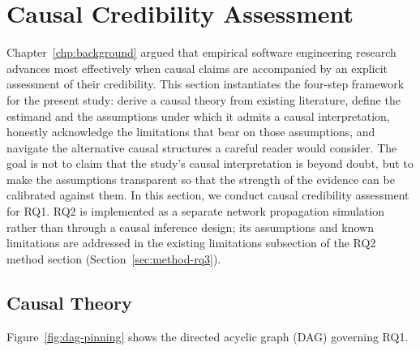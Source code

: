 \section{Causal Credibility Assessment}
\label{sec:pinning-credibility}

Chapter~\ref{chp:background} argued that empirical software engineering research advances most effectively when causal claims are accompanied by an explicit assessment of their credibility.
This section instantiates the four-step framework for the present study: derive a causal theory from existing literature, define the estimand and the assumptions under which it admits a causal interpretation, honestly acknowledge the limitations that bear on those assumptions, and navigate the alternative causal structures a careful reader would consider.
The goal is not to claim that the study's causal interpretation is beyond doubt, but to make the assumptions transparent so that the strength of the evidence can be calibrated against them.
In this section, we conduct causal credibility assessment for RQ1. 
RQ2 is implemented as a separate network propagation simulation rather than through a causal inference design; its assumptions and known limitations are addressed in the existing limitations subsection of the RQ2 method section (Section~\ref{sec:method-rq3}).

\subsection{Causal Theory}
\label{sec:pinning-credibility-theory}

Figure~\ref{fig:dag-pinning} shows the directed acyclic graph (DAG) governing RQ1.

